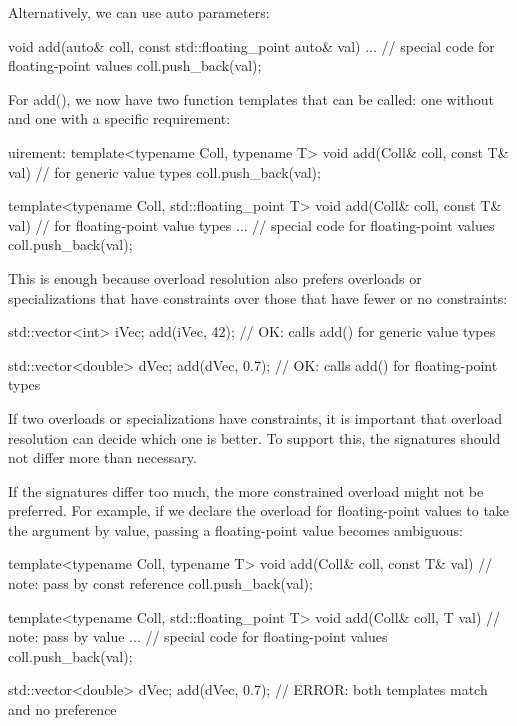 Alternatively, we can use auto parameters:

\begin{cpp}
void add(auto& coll, const std::floating_point auto& val)
{
	... // special code for floating-point values
	coll.push_back(val);
}
\end{cpp}

For add(), we now have two function templates that can be called: one without and one with a specific requirement:

\begin{cpp}
uirement:
template<typename Coll, typename T>
void add(Coll& coll, const T& val) // for generic value types
{
	coll.push_back(val);
}

template<typename Coll, std::floating_point T>
void add(Coll& coll, const T& val) // for floating-point value types
{
	... // special code for floating-point values
	coll.push_back(val);
}
\end{cpp}

This is enough because overload resolution also prefers overloads or specializations that have constraints over those that have fewer or no constraints:

\begin{cpp}
std::vector<int> iVec;
add(iVec, 42); // OK: calls add() for generic value types

std::vector<double> dVec;
add(dVec, 0.7); // OK: calls add() for floating-point types
\end{cpp}


If two overloads or specializations have constraints, it is important that overload resolution can decide which one is better. To support this, the signatures should not differ more than necessary.

If the signatures differ too much, the more constrained overload might not be preferred. For example, if we declare the overload for floating-point values to take the argument by value, passing a floating-point value becomes ambiguous:

\begin{cpp}
template<typename Coll, typename T>
void add(Coll& coll, const T& val) // note: pass by const reference
{
	coll.push_back(val);
}

template<typename Coll, std::floating_point T>
void add(Coll& coll, T val) // note: pass by value
{
	... // special code for floating-point values
	coll.push_back(val);
}

std::vector<double> dVec;
add(dVec, 0.7); // ERROR: both templates match and no preference
\end{cpp}

